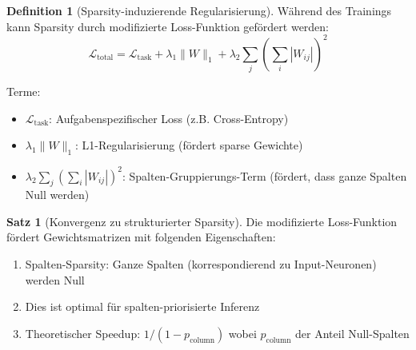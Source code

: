 \documentclass[a4paper,12pt]{report}
\theoremstyle{definition}
\newtheorem{definition}{Definition}
\newtheorem{satz}{Satz}
\begin{document}
	\begin{definition}[Sparsity-induzierende Regularisierung]
		Während des Trainings kann Sparsity durch modifizierte Loss-Funktion gefördert werden:
		\[
		\mathcal{L}_{\text{total}} = \mathcal{L}_{\text{task}} + \lambda_1 \|W\|_1 + \lambda_2 \sum_{j} \left(\sum_i |W_{ij}|\right)^2
		\]
		
		Terme:
		\begin{itemize}
			\item $\mathcal{L}_{\text{task}}$: Aufgabenspezifischer Loss (z.B. Cross-Entropy)
			\item $\lambda_1 \|W\|_1$: L1-Regularisierung (fördert sparse Gewichte)
			\item $\lambda_2 \sum_{j} (\sum_i |W_{ij}|)^2$: Spalten-Gruppierungs-Term (fördert, dass ganze Spalten Null werden)
		\end{itemize}
	\end{definition}
	
	\begin{satz}[Konvergenz zu strukturierter Sparsity]
		Die modifizierte Loss-Funktion fördert Gewichtsmatrizen mit folgenden Eigenschaften:
		\begin{enumerate}
			\item Spalten-Sparsity: Ganze Spalten (korrespondierend zu Input-Neuronen) werden Null
			\item Dies ist optimal für spalten-priorisierte Inferenz
			\item Theoretischer Speedup: $1 / (1 - p_{\text{column}})$ wobei $p_{\text{column}}$ der Anteil Null-Spalten
		\end{enumerate}
	\end{satz}
	
\end{document}
